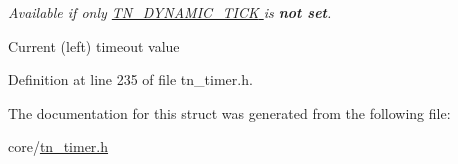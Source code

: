 {\itshape Available if only \hyperlink{tn__cfg__default_8h_aaee875834a86f961318c584095c366fe}{{\ttfamily T\+N\+\_\+\+D\+Y\+N\+A\+M\+I\+C\+\_\+\+T\+I\+C\+K} } is {\bfseries not set}.} 

Current (left) timeout value 

Definition at line 235 of file tn\+\_\+timer.\+h.



The documentation for this struct was generated from the following file\+:\begin{DoxyCompactItemize}
\item 
core/\hyperlink{tn__timer_8h}{tn\+\_\+timer.\+h}\end{DoxyCompactItemize}
